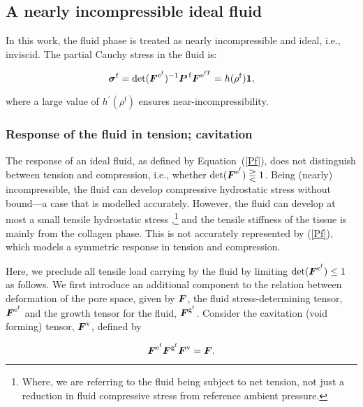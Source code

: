 \subsection{A nearly incompressible ideal fluid}
\label{ideal-incompressible-fluid}

In this work, the fluid phase is treated as nearly incompressible and
ideal, i.e., inviscid. The partial Cauchy stress in the fluid is:

\begin{equation}
\mbox{\boldmath$\sigma$}^\mathrm{f} = \mathrm{det}(\mbox{\boldmath$ F$}^{\mathrm{e}^\mathrm{f}})^{-1}
\mbox{\boldmath$ P$}^{\,\mathrm{f}}\mbox{\boldmath$ F$}^{\mathrm{e}^\mathrm{fT}} =
h(\rho^\mathrm{f}){\bf 1},\label{Pf}
\end{equation}

\noindent where a large value of $h^\prime(\rho^\mathrm{f})$ ensures
near-in\-comp\-ress\-i\-bil\-i\-ty.

\subsubsection{Response of the fluid in tension; cavitation}
\label{caviation-under-tension}

The response of an ideal fluid, as defined by \mbox{Equation
  (\ref{Pf})}, does not distinguish between tension and compression,
i.e., whether $\mathrm{det}(\mbox{\boldmath$ F$}^{\mathrm{e}^\mathrm{f}}) \gtreqless
1$. Being (nearly) incompressible, the fluid can develop compressive
hydrostatic stress without bound---a case that is modelled
accurately. However, the fluid can develop at most a small tensile
hydrostatic stress \citep{cavitationchris},\footnote{Where, we are
  referring to the fluid being subject to net tension, not just a
  reduction in fluid compressive stress from reference ambient
  pressure.} and the tensile stiffness of the tissue is mainly from
the collagen phase. This is not accurately represented by (\ref{Pf}),
which models a symmetric response in tension and compression.

Here, we preclude all tensile load carrying by the fluid by limiting
\mbox{$\mathrm{det}(\mbox{\boldmath$ F$}^{\mathrm{e}^\mathrm{f}}) \leq 1$} as
follows. We first introduce an additional component to the relation
between deformation of the pore space, given by $\mbox{\boldmath$ F$}$, the fluid
stress-determining tensor, $\mbox{\boldmath$ F$}^{\mathrm{e}^\mathrm{f}}$ and the
growth tensor for the fluid, $\mbox{\boldmath$ F$}^{\mathrm{g}^\mathrm{f}}$. Consider
the cavitation (void forming) tensor, $\mbox{\boldmath$ F$}^{\mathrm{v}}$, defined by
  
\begin{equation}
 \mbox{\boldmath$ F$}^{\mathrm{e}^\mathrm{f}}\mbox{\boldmath$ F$}^{\mathrm{g}^\mathrm{f}}
 \mbox{\boldmath$ F$}^{\mathrm{v}} = \mbox{\boldmath$ F$}.
\label{fvoid}
\end{equation}

